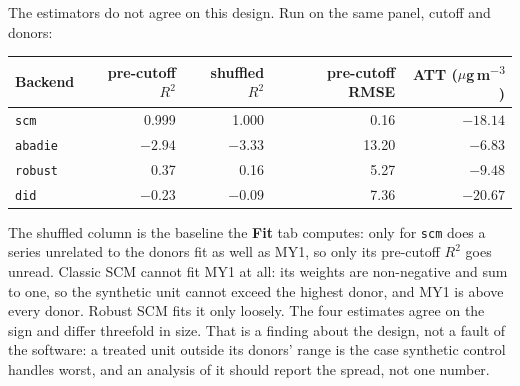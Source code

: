 \documentclass[11pt]{report}
\newcommand{\codeunderscore}{\textunderscore\allowbreak}
\newcommand{\code}[1]{\texttt{\let\_\codeunderscore #1}}
\newcommand{\tab}[1]{\textbf{#1}}
\newcommand{\ugm}{\ensuremath{\mu}g\,m\textsuperscript{$-3$}}
\begin{document}
The estimators do not agree on this design. Run on the same panel, cutoff and donors:
\begin{center}\small
\begin{tabular}{@{}lrrrr@{}}
\toprule
Backend & pre-cutoff $R^2$ & shuffled $R^2$ & pre-cutoff RMSE & ATT (\ugm{}) \\
\midrule
\code{scm}    & 0.999  & 1.000   & 0.16  & $-18.14$ \\
\code{abadie} & $-2.94$ & $-3.33$ & 13.20 & $-6.83$ \\
\code{robust} & 0.37   & 0.16    & 5.27  & $-9.48$ \\
\code{did}    & $-0.23$ & $-0.09$ & 7.36  & $-20.67$ \\
\bottomrule
\end{tabular}
\end{center}
The shuffled column is the baseline the \tab{Fit} tab computes: only for \code{scm} does
a series unrelated to the donors fit as well as MY1, so only its pre-cutoff $R^2$ goes
unread. Classic SCM cannot fit MY1 at all: its weights are non-negative and sum to one, so the
synthetic unit cannot exceed the highest donor, and MY1 is above every donor. Robust SCM
fits it only loosely. The four estimates agree on the sign and differ threefold in size.
That is a finding about the design, not a fault of the software: a treated unit outside
its donors' range is the case synthetic control handles worst, and an analysis of it
should report the spread, not one number.
\end{document}
